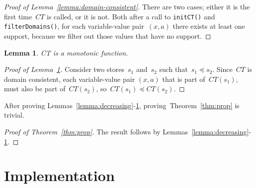 \documentclass[a4paper,11pt]{article}
\newtheorem{lemma}[theorem]{Lemma}
\newcommand{\T}[1]{\texttt{#1}}
\newcommand{\Thmref}[1]{Theorem~\ref{#1}}
\newcommand{\Lemmaref}[1]{Lemma~\ref{#1}}
\numberwithin{equation}{section}
\begin{document}
\begin{proof}[Proof of \Lemmaref{lemma:domain-consistent}]
  There are two cases; either it is the first time~$CT$ is called, or it
  is not. Both after a call to \T{initCT()} and \T{filterDomains()}, 
  for each variable-value
  pair~$(x,a)$ there exists at least one support, because we filter out those
  values that have no support.
\end{proof}

\begin{lemma}\label{lemma:monotonic}
  CT is a monotonic function.
\end{lemma}

\begin{proof}[Proof of \Lemmaref{lemma:monotonic}]
  Consider two stores~$s_1$ and~$s_2$ such that~$s_1 \preceq s_2$.
  Since~$CT$ is domain consistent, each variable-value pair $(x,a)$
  that is part of~$CT(s_1)$, must also be part of~$CT(s_2)$,
  so~$CT(s_1) \preceq CT(s_2)$.
\end{proof}


After proving Lemmas~\ref{lemma:decreasing}-\ref{lemma:monotonic},
proving~\Thmref{thm:prop} is trivial.

\begin{proof}[Proof of \Thmref{thm:prop}]
  The result follows by Lemmas~\ref{lemma:decreasing}-
  \ref{lemma:monotonic}.
\end{proof}

\section{Implementation}
\label{sec:implementation}

\end{document}
